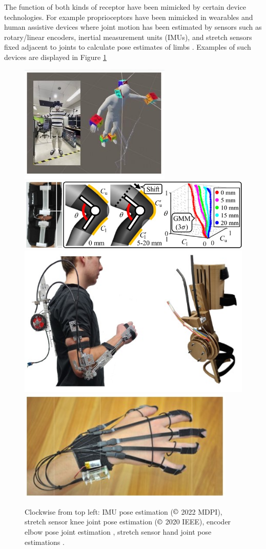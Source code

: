 The function of both kinds of receptor have been mimicked by certain device technologies. For example proprioceptors have been mimicked in wearables and human assistive devices where joint motion has been estimated by sensors such as rotary/linear encoders, inertial measurement units (IMUs), and stretch sensors fixed adjacent to joints to calculate pose estimates of limbs \cite{OBrien2014,Eguchi2020,Chatfield2021,Kim2022}. Examples of such devices are displayed in Figure \ref{fig:proprio-tech}
\begin{figure}[H]
    \centering
    \includegraphics[width=0.4\linewidth]{Figures/imu-pose-tracker-kim2022.jpg} %
    \includegraphics[width=0.4\linewidth]{Figures/knee-stretch-sense-eguchi2020.jpg} %
    \includegraphics[width=0.4\linewidth]{Figures/logan-assitive-arm-device.jpg}
    \includegraphics[width=0.4\linewidth]{Figures/stretch-sense-OBrien2014.jpg}
    \caption{Clockwise from top left: IMU pose estimation \cite{Kim2022} ($\copyright$ 2022 MDPI), stretch sensor knee joint pose estimation \cite{Eguchi2020} ($\copyright$ 2020 IEEE), encoder elbow pose joint estimation \cite{Chatfield2021}, stretch sensor hand joint pose estimations \cite{OBrien2014}.}
    \label{fig:proprio-tech}
\end{figure}
